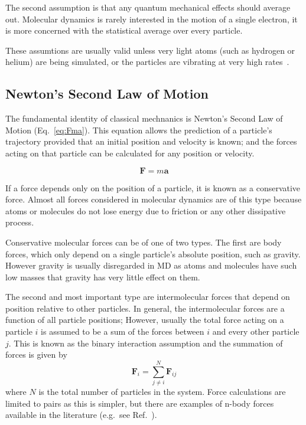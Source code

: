 \documentclass[12pt]{UoAthesis}
\begin{document}
The second assumption is that any quantum mechanical effects should
average out. Molecular dynamics is rarely interested in the motion of
a single electron, it is more concerned with the statistical average
over every particle.

These assumtions are usually valid unless very light atoms (such as
hydrogen or helium) are being simulated, or the particles are vibrating
at very high rates~\cite{Frenkel2002}.

\subsection{Newton's Second Law of Motion \label{NewtonLaw}}

The fundamental identity of classical mechnanics is Newton's Second
Law of Motion (Eq.~\eqref{eq:Fma}). This equation allows the
prediction of a particle's trajectory provided that an initial
position and velocity is known; and the forces acting on that particle
can be calculated for any position or velocity.

\begin{equation}
  \mathbf{F} = m\mathbf{a}
  \label{eq:Fma} 
\end{equation}
%
%
%

If a force depends only on the position of a particle, it is known as a
conservative force. Almost all forces considered in molecular dynamics
are of this type because atoms or molecules do not lose energy due to
friction or any other dissipative process.

Conservative molecular forces can be of one of two types.  The first
are body forces, which only depend on a single particle's absolute
position, such as gravity.  However gravity is usually disregarded in
MD as atoms and molecules have such low masses that gravity has very
little effect on them.

The second and most important type are intermolecular forces that
depend on position relative to other particles. In general, the
intermolecular forces are a function of all particle positions;
However, usually the total force acting on a particle $i$ is assumed
to be a sum of the forces between $i$ and every other particle
$j$. This is known as the binary interaction assumption and the
summation of forces is given by
\begin{equation}
  \mathbf{F}_i = \sum_{j \not= i}^{N}\mathbf{F}_{ij}
  \label{eq:pairwise}
\end{equation}
%
%
where $N$ is the total number of particles in the system.  Force
calculations are limited to pairs as this is simpler, but there are
examples of n-body forces available in the literature (e.g.\ see
Ref.~\cite{Tersoff1988}).
\end{document}
